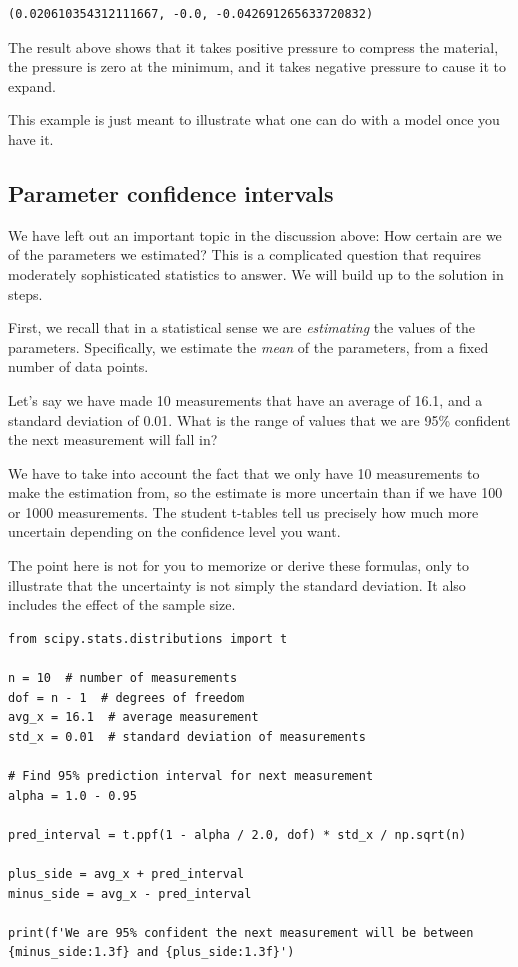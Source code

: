 \documentclass[11pt]{article}
\begin{document}
\begin{verbatim}
(0.020610354312111667, -0.0, -0.042691265633720832)
\end{verbatim}

The result above shows that it takes positive pressure to compress the material, the pressure is zero at the minimum, and it takes negative pressure to cause it to expand.

This example is just meant to illustrate what one can do with a model once you have it.

\subsection{Parameter confidence intervals}
\label{sec:org229c15d}

We have left out an important topic in the discussion above: How certain are we of the parameters we estimated? This is a complicated question that requires moderately sophisticated statistics to answer. We will build up to the solution in steps.

First, we recall that in a statistical sense we are \emph{estimating} the values of the parameters. Specifically, we estimate the \emph{mean} of the parameters, from a fixed number of data points.

Let's say we have made 10 measurements that have an average of 16.1, and a standard deviation of 0.01. What is the range of values that we are 95\% confident the next measurement will fall in?

We have to take into account the fact that we only have 10 measurements to make the estimation from, so the estimate is more uncertain than if we have 100 or 1000 measurements. The student t-tables tell us precisely how much more uncertain depending on the confidence level you want.

The point here is not for you to memorize or derive these formulas, only to illustrate that the uncertainty is not simply the standard deviation. It also includes the effect of the sample size.

\begin{verbatim}
from scipy.stats.distributions import t

n = 10  # number of measurements
dof = n - 1  # degrees of freedom
avg_x = 16.1  # average measurement
std_x = 0.01  # standard deviation of measurements

# Find 95% prediction interval for next measurement
alpha = 1.0 - 0.95

pred_interval = t.ppf(1 - alpha / 2.0, dof) * std_x / np.sqrt(n)

plus_side = avg_x + pred_interval
minus_side = avg_x - pred_interval

print(f'We are 95% confident the next measurement will be between {minus_side:1.3f} and {plus_side:1.3f}')
\end{verbatim}
\end{document}
